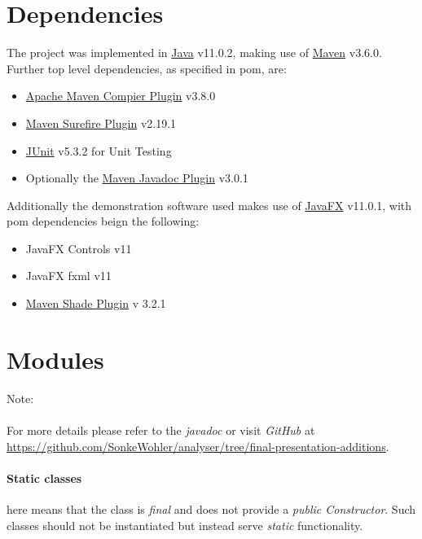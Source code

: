 \documentclass{article}
\begin{document}
   \section{Dependencies}
  
  The project was implemented in \href{https://openjdk.java.net/projects/jdk/11/}{Java} v11.0.2, making use of \href{http://maven.apache.org/}{Maven} v3.6.0. Further top level dependencies, as specified in pom, are:
  \begin{itemize}
    \item \href{https://maven.apache.org/plugins/maven-compiler-plugin/index.html}{Apache Maven Compier Plugin} v3.8.0
    \item \href{https://maven.apache.org/surefire/maven-surefire-plugin/}{Maven Surefire Plugin} v2.19.1
    \item \href{https://junit.org/junit5/}{JUnit} v5.3.2 for Unit Testing
    \item Optionally the \href{https://maven.apache.org/plugins/maven-javadoc-plugin/}{Maven Javadoc Plugin} v3.0.1
  \end{itemize}
  Additionally the demonstration software used makes use of \href{https://openjfx.io/}{JavaFX} v11.0.1, with pom dependencies beign the following:
  \begin{itemize}
    \item JavaFX Controls v11
    \item JavaFX fxml v11
    \item \href{https://maven.apache.org/plugins/maven-shade-plugin/}{Maven Shade Plugin} v 3.2.1
  \end{itemize}
  
  \section{Modules}
  
  Note:
  \\\\
  For more details please refer to the \textit{javadoc} or visit \textit{GitHub} at \url{https://github.com/SonkeWohler/analyser/tree/final-presentation-additions}.
  
  \paragraph{Static classes} here means that the class is \textit{final} and does not provide a \textit{public Constructor}. Such classes should not be instantiated but instead serve \textit{static} functionality.
  
\end{document}
